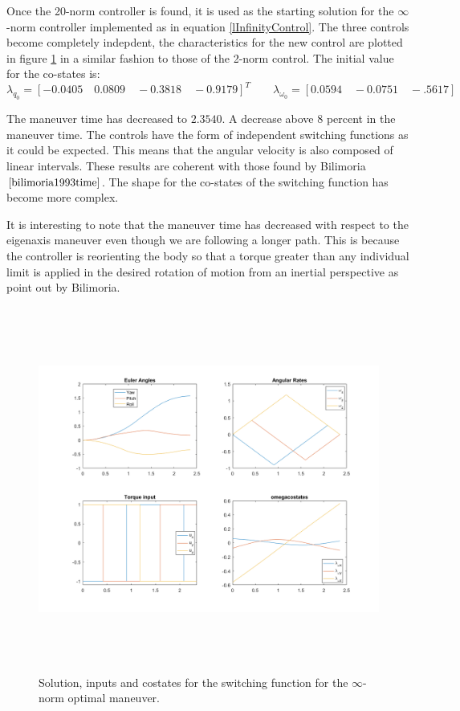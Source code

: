 Once the 20-norm controller is found, it is used as the starting solution for the $\infty$-norm controller implemented as in equation \ref{lInfinityControl}. The three controls become completely indepdent, the characteristics for the new control are plotted in figure \ref{fig:lInftyManeuver} in a similar fashion to those of the 2-norm control. The initial value for the co-states is:
\begin{equation}
\lambda_{q_0} = [-0.0405 \quad 0.0809 \quad -0.3818 \quad -0.9179]^T \qquad
\lambda_{\omega_0} = [0.0594 \quad -0.0751 \quad -.5617]
\end{equation}

The maneuver time has decreased to $2.3540$. A decrease above 8 percent in the maneuver time. The controls have the form of independent switching functions as it could be expected. This means that the angular velocity is also composed of linear intervals. These results are coherent with those found by Bilimoria$\cite{bilimoria1993time}$. The shape for the co-states of the switching function has become more complex.

It is interesting to note that the maneuver time has decreased with respect to the eigenaxis maneuver even though we are following a longer path. This is because the controller is reorienting the body so that a torque greater than any individual limit is applied in the desired rotation of motion from an inertial perspective as point out by Bilimoria\cite{bilimoria1993time}.

\begin{figure}[h]
	\centering
	\includegraphics[height=12cm,keepaspectratio]{media/lInftyManeuver.png}
	\caption{Solution, inputs and costates for the switching function for the $\infty$-norm optimal maneuver.}
	\label{fig:lInftyManeuver}
\end{figure}